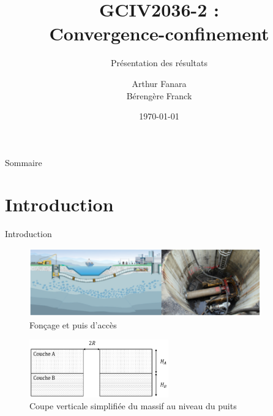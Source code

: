 \documentclass{beamer}
\title{GCIV2036-2 :\\ Convergence-confinement}
\subtitle{Présentation des résultats}
\author{Arthur Fanara \\ Bérengère Franck}
\institute{ULiège \\ Professeur : F. Collin\\ Assistant : G. Corman}
\date{\today}
\begin{document}
\scriptsize

\begin{frame}
	\maketitle %
\end{frame}


\begin{frame}{Sommaire}
  \tableofcontents
\end{frame}








\section{Introduction}


\begin{frame}{Introduction}

\begin{figure}
\centering
\includegraphics[width=10cm]{image.png}
\caption{Fonçage et puis d'accès}
\end{figure}

\begin{figure}
\centering
\includegraphics[width=6cm]{coupe.png}
\caption{Coupe verticale simplifiée du massif au niveau du puits}
\end{figure}

    
\end{frame}
\end{document}

